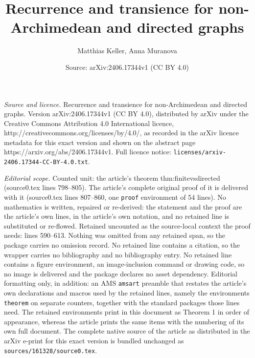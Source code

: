 \documentclass[10pt,a4paper]{amsart}
\title{Recurrence and transience for non-Archimedean and directed graphs}
\author{Matthias Keller, Anna Muranova}
\date{Source: arXiv:2406.17344v1 (CC BY 4.0)}
\begin{document}
\maketitle

\noindent\emph{Source and licence.} Recurrence and transience for non-Archimedean and directed graphs. Version arXiv:2406.17344v1 (CC BY 4.0), distributed by arXiv under the Creative Commons Attribution 4.0 International licence, http://creativecommons.org/licenses/by/4.0/, as recorded in the arXiv licence metadata for this exact version and shown on the abstract page https://arxiv.org/abs/2406.17344v1. Full licence notice: \texttt{licenses/arxiv-2406.17344-CC-BY-4.0.txt}.\par\smallskip

\noindent\textit{Editorial scope.} Counted unit: the article's theorem thm:finitevsdirected (source0.tex lines 798--805). The article's complete original proof of it is delivered with it (source0.tex lines 807--860, one \texttt{proof} environment of 54 lines). No mathematics is written, repaired or re-derived: the statement and the proof are the article's own lines, in the article's own notation, and no retained line is substituted or re-flowed.  Retained uncounted as the source-local context the proof needs: lines 590--613.  Nothing was omitted from any retained span, so the package carries no omission record.  No retained line contains a citation, so the wrapper carries no bibliography and no bibliography entry.  No retained line contains a figure environment, an image-inclusion command or drawing code, so no image is delivered and the package declares no asset dependency.  Editorial formatting only, in addition: an AMS \texttt{amsart} preamble that restates the article's own declarations and macros used by the retained lines, namely the environments \texttt{theorem} on separate counters, together with the standard packages those lines need.  The retained environments print in this document as Theorem 1 in order of appearance, whereas the article prints the same items with the numbering of its own full document.  The complete native source of the article as distributed in the arXiv e-print for this exact version is bundled unchanged as \texttt{sources/161328/source0.tex}.
\end{document}
